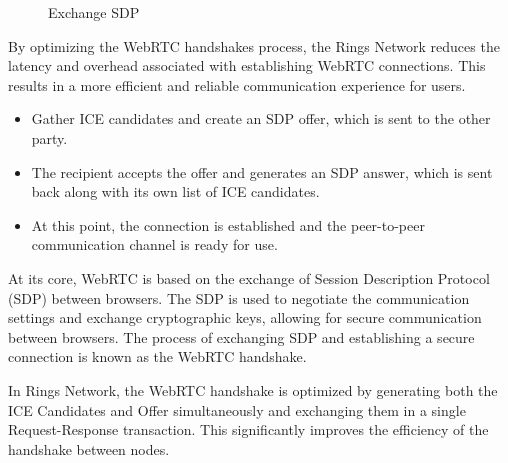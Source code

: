 \documentclass[twocolumn]{article}
\begin{document}
\begin{figure}[htbp]

\caption{Exchange SDP}
\end{figure}
By optimizing the WebRTC handshakes process, the Rings Network reduces the latency and overhead associated with establishing WebRTC connections. This results in a more efficient and reliable communication experience for users.

  \begin{itemize}[itemsep=2pt,topsep=0pt,parsep=0pt]

\item Gather ICE candidates and create an SDP offer, which is sent to the other party.
\item The recipient accepts the offer and generates an SDP answer, which is sent back along with its own list of ICE candidates.
\item At this point, the connection is established and the peer-to-peer communication channel is ready for use.
\end{itemize}
At its core, WebRTC is based on the exchange of Session Description Protocol (SDP) between browsers. The SDP is used to negotiate the communication settings and exchange cryptographic keys, allowing for secure communication between browsers. The process of exchanging SDP and establishing a secure connection is known as the WebRTC handshake.

In Rings Network, the WebRTC handshake is optimized by generating both the ICE Candidates and Offer simultaneously and exchanging them in a single Request-Response transaction. This significantly improves the efficiency of the handshake between nodes.
\end{document}
